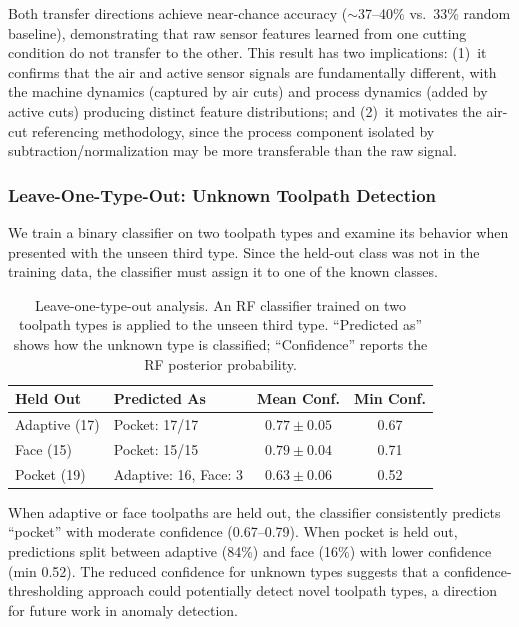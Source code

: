 Both transfer directions achieve near-chance accuracy ($\sim$37--40\% vs.\ 33\% random baseline), demonstrating that raw sensor features learned from one cutting condition do not transfer to the other. This result has two implications: (1)~it confirms that the air and active sensor signals are fundamentally different, with the machine dynamics (captured by air cuts) and process dynamics (added by active cuts) producing distinct feature distributions; and (2)~it motivates the air-cut referencing methodology, since the process component isolated by subtraction/normalization may be more transferable than the raw signal.

\subsubsection{Leave-One-Type-Out: Unknown Toolpath Detection}

We train a binary classifier on two toolpath types and examine its behavior when presented with the unseen third type. Since the held-out class was not in the training data, the classifier must assign it to one of the known classes.

\begin{table}[H]
\caption{Leave-one-type-out analysis. An RF classifier trained on two toolpath types is applied to the unseen third type. ``Predicted as'' shows how the unknown type is classified; ``Confidence'' reports the RF posterior probability.}\label{tab:loto}
\centering
\begin{tabular}{llcc}
\toprule
\textbf{Held Out} & \textbf{Predicted As} & \textbf{Mean Conf.} & \textbf{Min Conf.} \\
\midrule
Adaptive (17)  & Pocket: 17/17    & $0.77 \pm 0.05$ & 0.67 \\
Face (15)      & Pocket: 15/15    & $0.79 \pm 0.04$ & 0.71 \\
Pocket (19)    & Adaptive: 16, Face: 3   & $0.63 \pm 0.06$ & 0.52 \\
\bottomrule
\end{tabular}
\end{table}

When adaptive or face toolpaths are held out, the classifier consistently predicts ``pocket'' with moderate confidence (0.67--0.79). When pocket is held out, predictions split between adaptive (84\%) and face (16\%) with lower confidence (min 0.52). The reduced confidence for unknown types suggests that a confidence-thresholding approach could potentially detect novel toolpath types, a direction for future work in anomaly detection.

